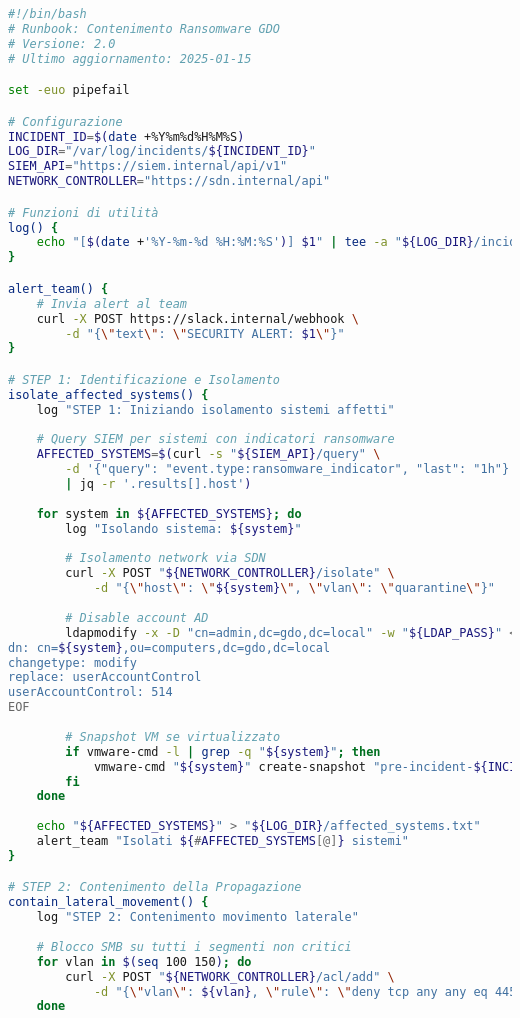 \begin{lstlisting}[language=bash, caption=Runbook automatizzato per contenimento ransomware]
#!/bin/bash
# Runbook: Contenimento Ransomware GDO
# Versione: 2.0
# Ultimo aggiornamento: 2025-01-15

set -euo pipefail

# Configurazione
INCIDENT_ID=$(date +%Y%m%d%H%M%S)
LOG_DIR="/var/log/incidents/${INCIDENT_ID}"
SIEM_API="https://siem.internal/api/v1"
NETWORK_CONTROLLER="https://sdn.internal/api"

# Funzioni di utilità
log() {
    echo "[$(date +'%Y-%m-%d %H:%M:%S')] $1" | tee -a "${LOG_DIR}/incident.log"
}

alert_team() {
    # Invia alert al team
    curl -X POST https://slack.internal/webhook \
        -d "{\"text\": \"SECURITY ALERT: $1\"}"
}

# STEP 1: Identificazione e Isolamento
isolate_affected_systems() {
    log "STEP 1: Iniziando isolamento sistemi affetti"
    
    # Query SIEM per sistemi con indicatori ransomware
    AFFECTED_SYSTEMS=$(curl -s "${SIEM_API}/query" \
        -d '{"query": "event.type:ransomware_indicator", "last": "1h"}' \
        | jq -r '.results[].host')
    
    for system in ${AFFECTED_SYSTEMS}; do
        log "Isolando sistema: ${system}"
        
        # Isolamento network via SDN
        curl -X POST "${NETWORK_CONTROLLER}/isolate" \
            -d "{\"host\": \"${system}\", \"vlan\": \"quarantine\"}"
        
        # Disable account AD
        ldapmodify -x -D "cn=admin,dc=gdo,dc=local" -w "${LDAP_PASS}" <<EOF
dn: cn=${system},ou=computers,dc=gdo,dc=local
changetype: modify
replace: userAccountControl
userAccountControl: 514
EOF
        
        # Snapshot VM se virtualizzato
        if vmware-cmd -l | grep -q "${system}"; then
            vmware-cmd "${system}" create-snapshot "pre-incident-${INCIDENT_ID}"
        fi
    done
    
    echo "${AFFECTED_SYSTEMS}" > "${LOG_DIR}/affected_systems.txt"
    alert_team "Isolati ${#AFFECTED_SYSTEMS[@]} sistemi"
}

# STEP 2: Contenimento della Propagazione  
contain_lateral_movement() {
    log "STEP 2: Contenimento movimento laterale"
    
    # Blocco SMB su tutti i segmenti non critici
    for vlan in $(seq 100 150); do
        curl -X POST "${NETWORK_CONTROLLER}/acl/add" \
            -d "{\"vlan\": ${vlan}, \"rule\": \"deny tcp any any eq 445\"}"
    done
    

\end{lstlisting}
